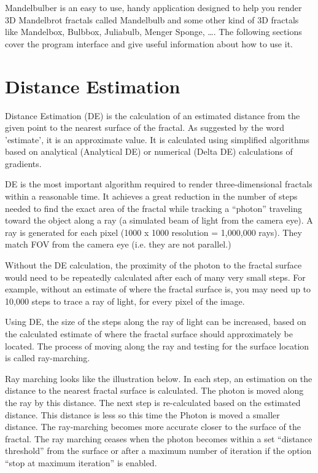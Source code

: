 Mandelbulber is an easy to use, handy application designed to help you render 3D
Mandelbrot fractals called Mandelbulb and some other kind of 3D fractals like
Mandelbox, Bulbbox, Juliabulb, Menger Sponge, \ldots{}. The following sections
cover the program interface and give useful information about how to use it.

\section{Distance Estimation}\label{distance-estimation}

Distance Estimation (DE) is the calculation of an estimated distance from the
given point to the nearest surface of the fractal. As suggested by the word
'estimate', it is an approximate value. It is calculated using simplified
algorithms based on analytical (Analytical DE) or numerical (Delta DE)
calculations of gradients.

DE is the most important algorithm required to render three-dimensional fractals
within a reasonable time. It achieves a great reduction in the number of steps
needed to find the exact area of the fractal while tracking a ``photon''
traveling toward the object along a ray (a simulated beam of light from the
camera eye). A ray is generated for each pixel (1000 x 1000 resolution =
1,000,000 rays). They match FOV from the camera eye (i.e. they are not
parallel.)

Without the DE calculation, the proximity of the photon to the fractal surface
would need to be repeatedly calculated after each of many very small steps. For
example, without an estimate of where the fractal surface is, you may need up to
10,000 steps to trace a ray of light, for every pixel of the image.

Using DE, the size of the steps along the ray of light can be increased, based
on the calculated estimate of where the fractal surface should approximately be
located. The process of moving along the ray and testing for the surface
location is called ray-marching.

Ray marching looks like the illustration below. In each step, an estimation on
the distance to the nearest fractal surface is calculated. The photon is moved
along the ray by this distance. The next step is re-calculated based on the
estimated distance. This distance is less so this time the Photon is moved a
smaller distance. The ray-marching becomes more accurate closer to the surface
of the fractal. The ray marching ceases when the photon becomes within a set
``distance threshold'' from the surface or after a maximum number of iteration
if the option ``stop at maximum iteration'' is enabled.

